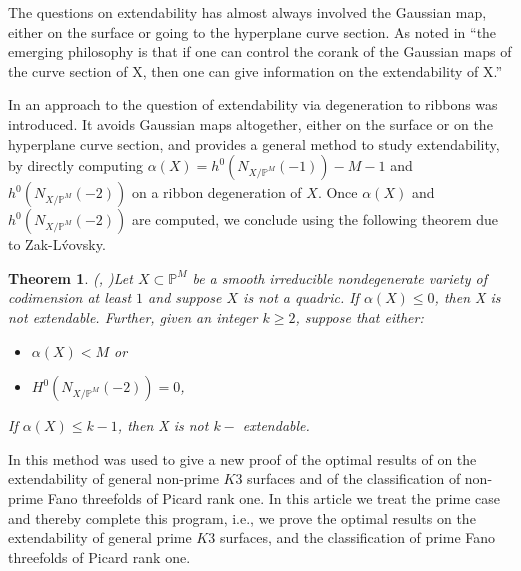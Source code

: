 \documentclass[11pt,twoside]{amsart}
\theoremstyle{plain}
\newtheorem{theorem}{Theorem}[section]
\theoremstyle{definition}
\begin{document}
\smallskip

The questions on extendability has almost always involved the Gaussian map, either on the surface or going to the hyperplane curve section. As noted in \cite{Lop23} ``the emerging philosophy is that if one can control the corank of the Gaussian maps of the curve section of X, then one can give information on the extendability of X.'' 

\smallskip

In \cite{BM24} an approach to the question of extendability via degeneration to ribbons was introduced. It avoids Gaussian maps altogether, either on the surface or on the hyperplane curve section, and provides a general method to study extendability, by directly computing $\alpha(X) = h^0(N_{X/\mathbb{P}^M}(-1))-M-1$ and $h^0(N_{X/\mathbb{P}^M}(-2))$ on a ribbon degeneration of $X$. Once $\alpha(X)$ and $h^0(N_{X/\mathbb{P}^M}(-2))$ are computed, we conclude using the following theorem due to Zak-L\'vovsky.

\begin{theorem}(\cite{Lvo92}, \cite{Zak91})\label{ZL}
Let $X \subset \mathbb{P}^{M}$ be a smooth irreducible nondegenerate variety of codimension at least $1$ and suppose $X$ is not a quadric. If $\alpha(X) \leq 0$, then X is not extendable. Further, given an integer $k \geq 2$, suppose that either:
\begin{itemize}
    \item[(1)] $\alpha(X) < M$ or
    \item[(2)] $H^0(N_{X/\mathbb{P}^M}(-2)) = 0$,
\end{itemize}
If $\alpha(X) \leq k-1$, then X is not $k-$ extendable.
\end{theorem}



In \cite{BM25} this method was used to give a new proof of the optimal results of \cite{CLM98} on the extendability of general non-prime $K3$ surfaces and of the classification of non-prime Fano threefolds of Picard rank one. 
In this article we treat the prime case and thereby complete this program, i.e., we prove the optimal results on the extendability of general prime $K3$ surfaces, and the classification of prime Fano threefolds of Picard rank one. 
\end{document}
